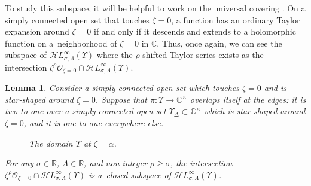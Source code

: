 \documentclass[10pt,a4paper]{amsart}
\newcommand{\singexp}[2]{\mathcal{H}L^\infty_{#1, #2}}
\newcommand{\maps}{\colon}
\newcommand{\R}{\mathbb{R}}
\newcommand{\C}{\mathbb{C}}
\numberwithin{equation}{section}
\newtheorem{Lemma}[Theorem]{Lemma}
\begin{document}
To study this subspace, it will be helpful to work on the universal covering \smash{$\pi \maps \widetilde{\C^\times} \to \C^\times$}. On a simply connected open set \smash{$\Upsilon \subset \widetilde{\C^\times}$} that touches $\zeta = 0$, a function has an ordinary Taylor expansion around $\zeta = 0$ if and only if it descends and extends to a holomorphic function on a~neighborhood of $\zeta = 0$ in $\C$. Thus, once again, we can see the subspace of $\singexp{\sigma}{\Lambda}(\Upsilon)$ where the $\rho$-shifted Taylor series exists as the intersection
$ \zeta^\rho \mathcal{O}_{\zeta = 0} \cap \singexp{\sigma}{\Lambda}(\Upsilon)$.
\begin{Lemma}\label{lem:shifted_holo_closed}
Consider a simply connected open set \smash{$\Upsilon \subset \widetilde{\C^\times}$} which touches $\zeta = 0$ and is star-shaped around $\zeta = 0$. Suppose that $\pi \maps \Upsilon \to \C^\times$ overlaps itself at the edges: it is two-to-one over a simply connected open set $\Upsilon_\Delta \subset \C^\times$ which is star-shaped around $\zeta = 0$, and it is one-to-one everywhere else.

\begin{figure}[!ht]\centering\vspace{-15mm}

\hspace*{-19mm}\vspace{-14mm}

\caption{The domain $\Upsilon$ at $\zeta=\alpha$.}\label{fig:domain_Upsilon}
\end{figure}

\noindent
For any $\sigma \in \R$, $\Lambda \in \R$, and non-integer $\rho \ge \sigma$, the intersection~${\zeta^\rho \mathcal{O}_{\zeta = 0} \cap \singexp{\sigma}{\Lambda}(\Upsilon)}$
is a~closed subspace of $\singexp{\sigma}{\Lambda}(\Upsilon)$.
\end{Lemma}
\end{document}
